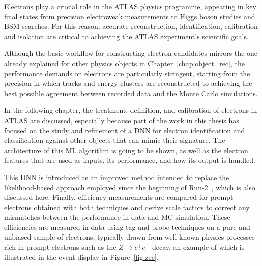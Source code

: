 \newcommand*{\zee}{$Z \to e^{+}e^{-}$\xspace}
\newcommand*{\et}{$E_{\text{T}}$\xspace}
\newcommand*{\zmass}{$\texttt{Z}_{\text{mass}}$\xspace}
\newcommand*{\ziso}{$\texttt{Z}_{\text{iso}}$\xspace}
\newcommand*{\tp}{T$\&$P\xspace}
\newcommand*{\et}{$E_{\text{T}}$\xspace}
\newcommand*{\eta}{$\eta$\xspace}

\setcounter{secnumdepth}{3}

Electrons play a crucial role in the ATLAS physics programme, appearing in key final states from precision electroweak measurements to Higgs boson studies and BSM searches. For this reason, accurate reconstruction, identification, calibration and isolation are critical to achieving the ATLAS experiment’s scientific goals.  

Although the basic workflow for constructing electron candidates mirrors the one already explained for other physics objects in Chapter~\ref{chap:object_rec}, the performance demands on electrons are particularly stringent, starting from the precision in which tracks and energy clusters are reconstructed to achieving the best possible agreement between recorded data and the Monte Carlo simulations.  

In the following chapter, the treatment, definition, and calibration of electrons in ATLAS are discussed, especially because part of the work in this thesis has focused on the study and refinement of a DNN for electron identification and classification against other objects that can mimic their signature.  The architecture of this ML algorithm is going to be shown, as well as the electron features that are used as inputs, its performance, and how its output is handled. 

This DNN is introduced as an improved method intended to replace the likelihood-based approach employed since the beginning of Run-2~\cite{Aad:2684552,Aaboud:2657964}, which is also discussed here.  Finally, efficiency measurements are compared for prompt electrons obtained with both techniques and derive scale factors to correct any mismatches between the performance in data and MC simulation.  These efficiencies are measured in data using tag-and-probe techniques on a pure and unbiased sample of electrons, typically drawn from well-known physics processes rich in prompt electrons such as the $Z\to e^+e^-$ decay, an example of which is illustrated in the event display in Figure~\ref{fig:zee}.

